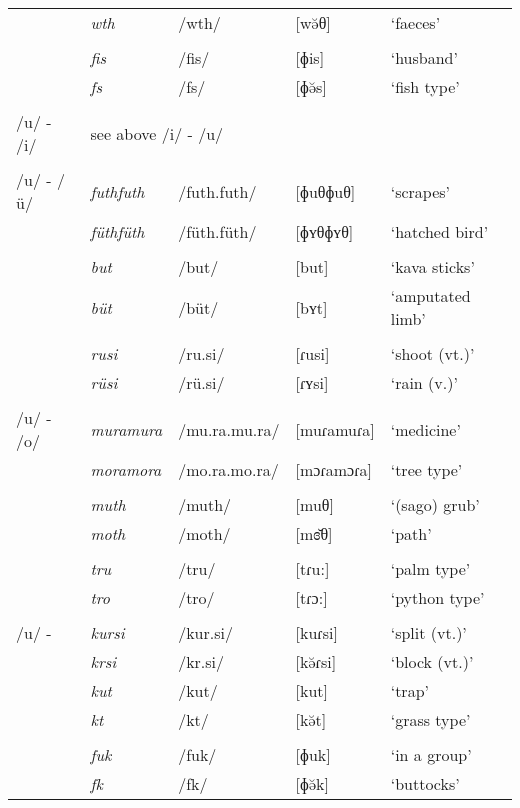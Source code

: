 \begin{table}
\begin{tabularx}{\textwidth}{lllll}
		& \emph{wth} & /wth/ &[wə̆θ]&	`faeces'\\
		&&&&\\
		& \emph{fis} & /fis/ & [ɸis] & `husband'\\
		& \emph{fs} & /fs/ & [ɸə̆s] & `fish type'\\
		&&&&\\
		/u/ - /i/ & \multicolumn{4}{l}{see above /i/ - /u/}\\
		&&&&\\
		/u/ - /ü/ & \emph{futhfuth} & /futh.futh/ & [ɸuθɸuθ] & `scrapes'\\
		& \emph{füthfüth} & /füth.füth/ & [ɸʏθɸʏθ] & `hatched bird'\\
		&&&&\\
		& \emph{but} & /but/ & [\super{m}but] & `kava sticks'\\
		& \emph{büt} & /büt/ & [\super{m}bʏt] & `amputated limb'\\
		&&&&\\
		& \emph{rusi} & /ru.si/ & [ɾusi] & `shoot (vt.)'\\
		& \emph{rüsi} & /rü.si/ & [ɾʏsi] & `rain (v.)'\\
		&&&&\\
		/u/ - /o/ & \emph{muramura} & /mu.ra.mu.ra/ & [muɾamuɾa] & `medicine'\\
		& \emph{moramora} & /mo.ra.mo.ra/ & [mɔɾamɔɾa] & `tree type'\\
		&&&&\\
		& \emph{muth} & /muth/ & [muθ] & `(sago) grub'\\
		& \emph{moth} & /moth/ & [mɞ̆θ] & `path'\\
		&&&&\\
		& \emph{tru} & /tru/ & [tɾu:] & `palm type'\\
		& \emph{tro} & /tro/ & [tɾɔ:] & `python type'\\
		&&&&\\
		/u/ - \Zero{} & \emph{kursi} & /kur.si/ & [kuɾsi] & `split (vt.)'\\
		& \emph{krsi}  & /kr.si/  &	[kə̆ɾsi] & `block (vt.)'\\
		& \emph{kut} & /kut/ & [kut] & `trap'\\
		& \emph{kt} & /kt/ & [kə̆t] & `grass type'\\
		&&&&\\
		& \emph{fuk} & /fuk/ & [ɸuk] & `in a group'\\
		& \emph{fk} & /fk/ & [ɸə̆k] & `buttocks'\\

\end{tabularx}
\end{table}
